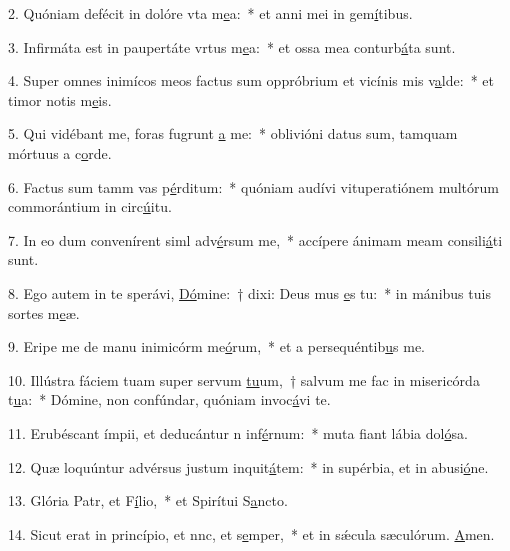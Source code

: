 2. Quóniam defécit in dolóre vta m\uline{e}a:~* et anni mei in gem\uline{í}tibus.\par 
3. Infirmáta est in paupertáte vrtus m\uline{e}a:~* et ossa mea conturb\uline{á}ta sunt.\par 
4. Super omnes inimícos meos factus sum oppróbrium et vicínis mis v\uline{a}lde:~* et timor notis m\uline{e}is.\par 
5. Qui vidébant me, foras fugrunt \uline{a} me:~* oblivióni datus sum, tamquam mórtuus a c\uline{o}rde.\par 
6. Factus sum tamm vas p\uline{é}rditum:~* quóniam audívi vituperatiónem multórum commorántium in circ\uline{ú}itu.\par 
7. In eo dum convenírent siml adv\uline{é}rsum me,~* accípere ánimam meam consili\uline{á}ti sunt.\par 
8. Ego autem in te sperávi, \uline{Dó}mine:~† dixi: Deus mus \uline{e}s tu:~* in mánibus tuis sortes m\uline{e}æ.\par 
9. Eripe me de manu inimicórm me\uline{ó}rum,~* et a persequéntib\uline{u}s me.\par 
10. Illústra fáciem tuam super servum \uline{tu}um,~† salvum me fac in misericórda t\uline{u}a:~* Dómine, non confúndar, quóniam invoc\uline{á}vi te.\par 
11. Erubéscant ímpii, et deducántur n inf\uline{é}rnum:~* muta fiant lábia dol\uline{ó}sa.\par 
12. Quæ loquúntur advérsus justum inquit\uline{á}tem:~* in supérbia, et in abusi\uline{ó}ne.\par 
13. Glória Patr, et F\uline{í}lio,~* et Spirítui S\uline{a}ncto.\par 
14. Sicut erat in princípio, et nnc, et s\uline{e}mper,~* et in sǽcula sæculórum. \uline{A}men.\par 
